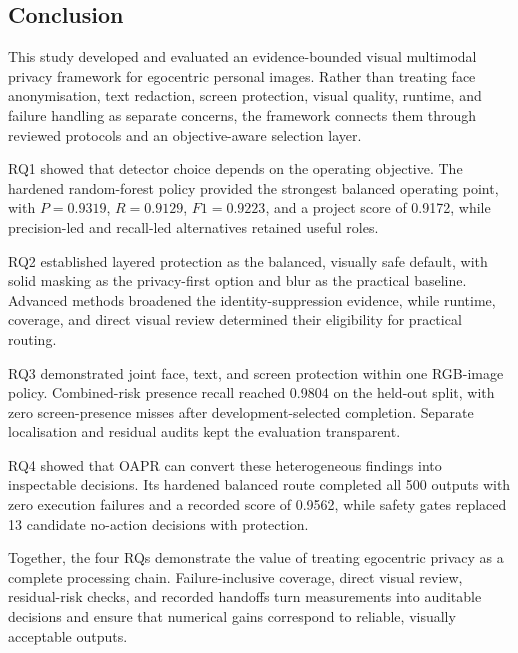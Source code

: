 \documentclass[10pt,twocolumn]{IEEEtran}
\begin{document}
\begin{strip}
\begin{minipage}[t]{0.485\textwidth}
\small
\linespread{1.035}\selectfont
\setlength{\parskip}{3.5pt}
\section{Conclusion}

This study developed and evaluated an evidence-bounded visual multimodal
privacy framework for egocentric personal images. Rather than treating face
anonymisation, text redaction, screen protection, visual quality, runtime, and
failure handling as separate concerns, the framework connects them through
reviewed protocols and an objective-aware selection layer.

RQ1 showed that detector choice depends on the operating objective. The
hardened random-forest policy provided the strongest balanced operating point,
with $P=0.9319$, $R=0.9129$, $F1=0.9223$, and a project score of 0.9172, while
precision-led and recall-led alternatives retained useful roles.

RQ2 established layered protection as the balanced, visually safe default, with
solid masking as the privacy-first option and blur as the practical baseline.
Advanced methods broadened the identity-suppression evidence, while runtime,
coverage, and direct visual review determined their eligibility for practical
routing.

RQ3 demonstrated joint face, text, and screen protection within one RGB-image
policy. Combined-risk presence recall reached 0.9804 on the held-out split, with
zero screen-presence misses after development-selected completion. Separate
localisation and residual audits kept the evaluation transparent.

RQ4 showed that OAPR can convert these heterogeneous findings into inspectable
decisions. Its hardened balanced route completed all 500 outputs with zero
execution failures and a recorded score of 0.9562, while safety gates replaced
13 candidate no-action decisions with protection.

Together, the four RQs demonstrate the value of treating egocentric privacy as
a complete processing chain. Failure-inclusive coverage, direct visual review,
residual-risk checks, and recorded handoffs turn measurements into auditable
decisions and ensure that numerical gains correspond to reliable, visually
acceptable outputs.


\end{minipage}
\end{strip}
\end{document}
